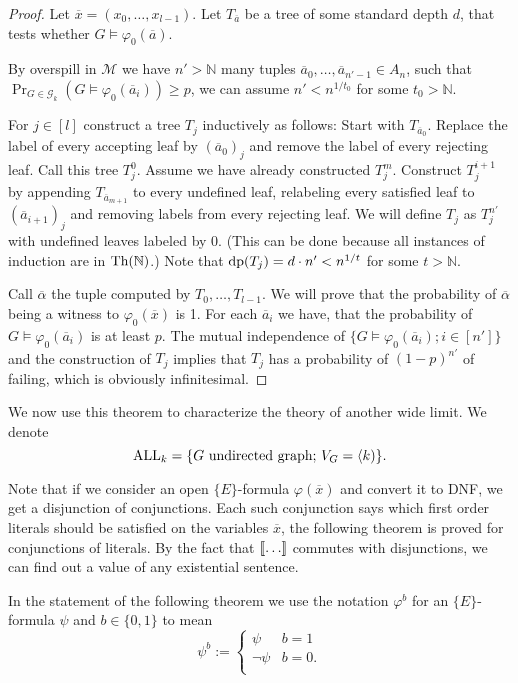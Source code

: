 \begin{proof}
Let $\overline x = (x_0,\dots,x_{l-1})$. Let $T_{\overline a}$ be a tree of some standard depth $d$, that tests whether $G\models\varphi_0(\overline a)$.

By overspill in $\mathcal{M}$ we have $n'>\mathbb{N}$ many tuples \(\overline a_0,\dots,\overline a_{n'-1}\in A_n\), such that \(\Pr_{G\in\mathcal{G}_k}(G\models\varphi_0(\overline a_i))\geq p\), we can assume $n'<n^{1/t_0}$ for some $t_0>\mathbb{N}$.


For $j\in[l]$ construct a tree $T_j$ inductively as follows: Start with $T_{\overline a_0}$. Replace the label of every accepting leaf by $(\overline a_0)_j$ and remove the label of every rejecting leaf. Call this tree $T_j^0$. Assume we have already constructed $T_j^{m}$. Construct $T_j^{i+1}$ by appending $T_{\overline a_{m+1}}$ to every undefined leaf, relabeling every satisfied leaf to $(\overline a_{i+1})_j$ and removing labels from every rejecting leaf. We will define $T_j$ as $T_j^{n'}$ with undefined leaves labeled by $0$. (This can be done because all instances of induction are in $\text{Th}(\mathbb{N})$.) Note that $\text{dp}(T_j)=d\cdot n' < n^{1/t}$ for some $t>\mathbb{N}$. 

Call $\overline \alpha$ the tuple computed by $T_0,\dots,T_{l-1}$. We will prove that the probability of $\overline \alpha$ being a witness to $\varphi_0(\overline x)$ is 1. For each $\overline a_i$ we have, that the probability of $G\models\varphi_0(\overline a_i)$ is at least $p$. The mutual independence of ${\{G\models\varphi_0(\overline a_i);i\in[n']\}}$ and the construction of $T_j$ implies that $T_j$ has a probability of $(1-p)^{n'}$ of failing, which is obviously infinitesimal.
\end{proof}

We now use this theorem to characterize the theory of another wide limit. We denote
\[\text{ALL}_k=\{G \text{ undirected graph; }V_G=\langle k)\}.\]

Note that if we consider an open $\{E\}$-formula $\varphi(\overline x)$ and convert it to DNF, we get a disjunction of conjunctions. Each such conjunction says which first order literals should be satisfied on the variables $\overline x$, the following theorem is proved for conjunctions of literals. By the fact that $\bbl\dots\bbr$ commutes with disjunctions, we can find out a value of any existential sentence.

In the statement of the following theorem we use the notation $\varphi^b$ for an $\{E\}$-formula $\psi$ and $b\in\{0,1\}$ to mean
\[\psi^b:=
\begin{cases}
\psi & b=1\\
\lnot \psi & b=0.\\
\end{cases}
\]

